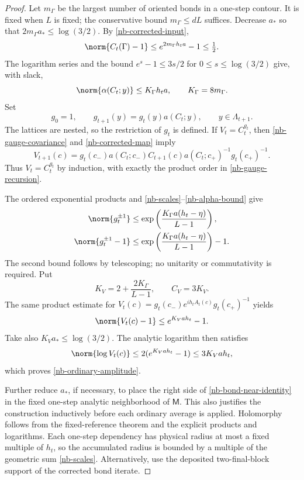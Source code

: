 \begin{proof}
Let $m_\Gamma$ be the largest number of oriented bonds in a
one-step contour. It is fixed when $L$ is fixed; the conservative
bound $m_\Gamma\le dL$ suffices. Decrease $a_*$ so that
$2m_\Gamma a_*\le\log(3/2)$. By
\eqref{nb-corrected-input},
\[
 \norm{C_t(\Gamma)-1}
      \le e^{2m_\Gamma h_ta}-1\le\tfrac12.
\]
The logarithm series and the bound
$e^s-1\le3s/2$ for $0\le s\le\log(3/2)$ give, with slack,
\begin{equation}\label{nb-alpha-bound}
 \norm{\alpha(C_t;y)}\le K_\Gamma h_ta,
                   \qquad K_\Gamma=8m_\Gamma.
\end{equation}
Set
\begin{equation}\label{nb-gauge-recursion}
 g_0=1,\qquad
 g_{t+1}(y)=g_t(y)a(C_t;y),\qquad y\in\Lambda_{t+1}.
\end{equation}
The lattices are nested, so the restriction of $g_t$ is defined.
If $V_t=C_t^{g_t}$, then \eqref{nb-gauge-covariance} and
\eqref{nb-corrected-map} imply
\[
 V_{t+1}(c)=g_t(c_-)a(C_t;c_-)C_{t+1}(c)
                       a(C_t;c_+)^{-1}g_t(c_+)^{-1}.
\]
Thus $V_t=C_t^{g_t}$ by induction, with exactly the product
order in \eqref{nb-gauge-recursion}.

The ordered exponential products and
\eqref{nb-scales}--\eqref{nb-alpha-bound} give
\begin{align}
 \norm{g_t^{\pm1}}
       &\le\exp\left(\frac{K_\Gamma a(h_t-\eta)}{L-1}\right),
       \label{nb-gauge-size}\\
 \norm{g_t^{\pm1}-1}
       &\le\exp\left(\frac{K_\Gamma a(h_t-\eta)}{L-1}\right)-1.
       \label{nb-gauge-difference}
\end{align}
The second bound follows by telescoping; no unitarity or
commutativity is required. Put
\begin{equation}\label{nb-explicit-constants}
 K_V=2+\frac{2K_\Gamma}{L-1},\qquad C_V=3K_V.
\end{equation}
The same product estimate for
$V_t(c)=g_t(c_-)e^{ih_tA_t(c)}g_t(c_+)^{-1}$ yields
\begin{equation}\label{nb-bond-near-identity}
 \norm{V_t(c)-1}\le e^{K_Vah_t}-1.
\end{equation}
Take also $K_Va_*\le\log(3/2)$. The analytic logarithm then
satisfies
\[
 \norm{\log V_t(c)}
    \le2(e^{K_Vah_t}-1)\le3K_Vah_t,
\]
which proves \eqref{nb-ordinary-amplitude}.

Further reduce $a_*$, if necessary, to place the right side of
\eqref{nb-bond-near-identity} in the fixed one-step analytic
neighborhood of $\mathsf M$. This also justifies the construction
inductively before each ordinary average is applied. Holomorphy
follows from the fixed-reference theorem and the explicit
products and logarithms. Each one-step dependency has physical
radius at most a fixed multiple of $h_t$, so the accumulated
radius is bounded by a multiple of the geometric sum
\eqref{nb-scales}. Alternatively, use the deposited two-final-block
support of the corrected bond iterate.
\end{proof}

